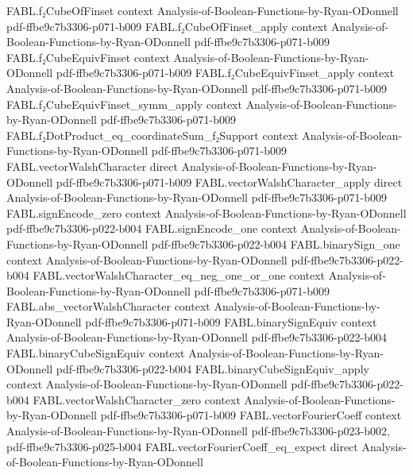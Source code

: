 \begin{theorem}
\proofstep
  {FABL.f₂CubeOfFinset}
  {context}
  {Analysis-of-Boolean-Functions-by-Ryan-ODonnell}
  {pdf-ffbe9c7b3306-p071-b009}
\proofstep
  {FABL.f₂CubeOfFinset_apply}
  {context}
  {Analysis-of-Boolean-Functions-by-Ryan-ODonnell}
  {pdf-ffbe9c7b3306-p071-b009}
\proofstep
  {FABL.f₂CubeEquivFinset}
  {context}
  {Analysis-of-Boolean-Functions-by-Ryan-ODonnell}
  {pdf-ffbe9c7b3306-p071-b009}
\proofstep
  {FABL.f₂CubeEquivFinset_apply}
  {context}
  {Analysis-of-Boolean-Functions-by-Ryan-ODonnell}
  {pdf-ffbe9c7b3306-p071-b009}
\proofstep
  {FABL.f₂CubeEquivFinset_symm_apply}
  {context}
  {Analysis-of-Boolean-Functions-by-Ryan-ODonnell}
  {pdf-ffbe9c7b3306-p071-b009}
\proofstep
  {FABL.f₂DotProduct_eq_coordinateSum_f₂Support}
  {context}
  {Analysis-of-Boolean-Functions-by-Ryan-ODonnell}
  {pdf-ffbe9c7b3306-p071-b009}
\proofstep
  {FABL.vectorWalshCharacter}
  {direct}
  {Analysis-of-Boolean-Functions-by-Ryan-ODonnell}
  {pdf-ffbe9c7b3306-p071-b009}
\proofstep
  {FABL.vectorWalshCharacter_apply}
  {direct}
  {Analysis-of-Boolean-Functions-by-Ryan-ODonnell}
  {pdf-ffbe9c7b3306-p071-b009}
\proofstep
  {FABL.signEncode_zero}
  {context}
  {Analysis-of-Boolean-Functions-by-Ryan-ODonnell}
  {pdf-ffbe9c7b3306-p022-b004}
\proofstep
  {FABL.signEncode_one}
  {context}
  {Analysis-of-Boolean-Functions-by-Ryan-ODonnell}
  {pdf-ffbe9c7b3306-p022-b004}
\proofstep
  {FABL.binarySign_one}
  {context}
  {Analysis-of-Boolean-Functions-by-Ryan-ODonnell}
  {pdf-ffbe9c7b3306-p022-b004}
\proofstep
  {FABL.vectorWalshCharacter_eq_neg_one_or_one}
  {context}
  {Analysis-of-Boolean-Functions-by-Ryan-ODonnell}
  {pdf-ffbe9c7b3306-p071-b009}
\proofstep
  {FABL.abs_vectorWalshCharacter}
  {context}
  {Analysis-of-Boolean-Functions-by-Ryan-ODonnell}
  {pdf-ffbe9c7b3306-p071-b009}
\proofstep
  {FABL.binarySignEquiv}
  {context}
  {Analysis-of-Boolean-Functions-by-Ryan-ODonnell}
  {pdf-ffbe9c7b3306-p022-b004}
\proofstep
  {FABL.binaryCubeSignEquiv}
  {context}
  {Analysis-of-Boolean-Functions-by-Ryan-ODonnell}
  {pdf-ffbe9c7b3306-p022-b004}
\proofstep
  {FABL.binaryCubeSignEquiv_apply}
  {context}
  {Analysis-of-Boolean-Functions-by-Ryan-ODonnell}
  {pdf-ffbe9c7b3306-p022-b004}
\proofstep
  {FABL.vectorWalshCharacter_zero}
  {context}
  {Analysis-of-Boolean-Functions-by-Ryan-ODonnell}
  {pdf-ffbe9c7b3306-p071-b009}
\proofstep
  {FABL.vectorFourierCoeff}
  {context}
  {Analysis-of-Boolean-Functions-by-Ryan-ODonnell}
  {pdf-ffbe9c7b3306-p023-b002,
    pdf-ffbe9c7b3306-p025-b004}
\proofstep
  {FABL.vectorFourierCoeff_eq_expect}
  {direct}
  {Analysis-of-Boolean-Functions-by-Ryan-ODonnell}

\end{theorem}
